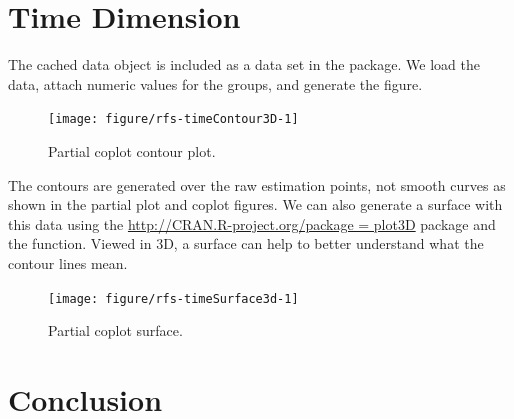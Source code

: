 \documentclass[nojss]{jss}\usepackage[]{graphicx}\usepackage[]{color}
\begin{document}

\section{Time Dimension}






The cached  data object is included as a data set in the  package. We load the data, attach numeric values for the  groups, and generate the figure.

\begin{Schunk}
\begin{figure}[!htpb]

{\centering \texttt{[image: figure/rfs-timeContour3D-1]} 

}

\caption[Partial coplot contour plot]{Partial coplot contour plot.\label{fig:timeContour3D}}
\end{figure}
\end{Schunk}

The contours are generated over the raw  estimation points, not smooth curves as shown in the partial plot and coplot figures. We can also generate a surface with this data using the  \url{http://CRAN.R-project.org/package = plot3D} package and the  function. Viewed in 3D, a surface can help to better understand what the contour lines mean. 

\begin{Schunk}
\begin{figure}[!htpb]

{\centering \texttt{[image: figure/rfs-timeSurface3d-1]} 

}

\caption[Partial coplot surface]{Partial coplot surface.\label{fig:timeSurface3d}}
\end{figure}
\end{Schunk}

\section{Conclusion}

\appendix


\end{document}
